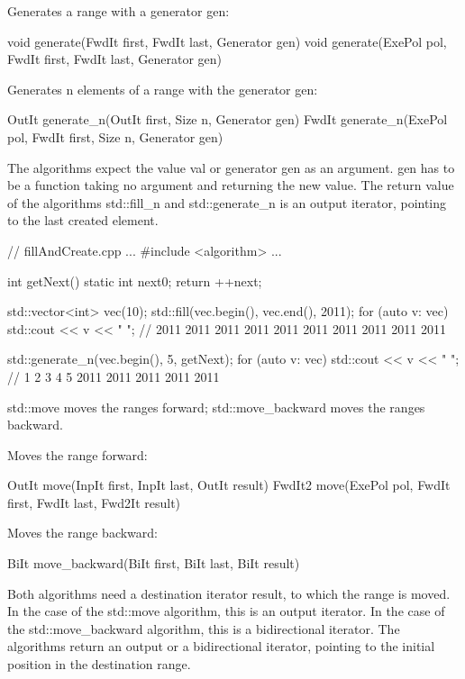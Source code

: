 Generates a range with a generator gen:

\begin{cpp}
void generate(FwdIt first, FwdIt last, Generator gen)
void generate(ExePol pol, FwdIt first, FwdIt last, Generator gen)
\end{cpp}

Generates n elements of a range with the generator gen:

\begin{cpp}
OutIt generate_n(OutIt first, Size n, Generator gen)
FwdIt generate_n(ExePol pol, FwdIt first, Size n, Generator gen)
\end{cpp}

The algorithms expect the value val or generator gen as an argument. gen has to be a function taking no argument and returning the new value. The return value of the algorithms std::fill\_n and std::generate\_n is an output iterator, pointing to the last created element.


\begin{cpp}
// fillAndCreate.cpp
...
#include <algorithm>
...

int getNext(){
	static int next{0};
	return ++next;
}

std::vector<int> vec(10);
std::fill(vec.begin(), vec.end(), 2011);
for (auto v: vec) std::cout << v << " ";
						// 2011 2011 2011 2011 2011 2011 2011 2011 2011 2011

std::generate_n(vec.begin(), 5, getNext);
for (auto v: vec) std::cout << v << " ";
						// 1 2 3 4 5 2011 2011 2011 2011 2011
\end{cpp}


std::move moves the ranges forward; std::move\_backward moves the ranges backward.

Moves the range forward:

\begin{cpp}
OutIt move(InpIt first, InpIt last, OutIt result)
FwdIt2 move(ExePol pol, FwdIt first, FwdIt last, Fwd2It result)
\end{cpp}

Moves the range backward:

\begin{cpp}
BiIt move_backward(BiIt first, BiIt last, BiIt result)
\end{cpp}

Both algorithms need a destination iterator result, to which the range is moved. In the case of the std::move algorithm, this is an output iterator. In the case of the std::move\_backward algorithm, this is a bidirectional iterator. The algorithms return an output or a bidirectional iterator, pointing to the initial position in the destination range.

